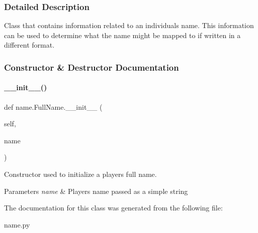 \subsubsection{Detailed Description}
\begin{DoxyVerb}Class that contains information related to an individuals name. This information can be used to determine what the name might be mapped to if written in a different format.
\end{DoxyVerb}
 

\subsubsection{Constructor \& Destructor Documentation}
\mbox{\label{classname_1_1FullName_a28652799b3836b5dbad3504fdc70c34c}} 
\paragraph{\texorpdfstring{\+\_\+\+\_\+init\+\_\+\+\_\+()}{\_\_init\_\_()}}
{\footnotesize\ttfamily def name.\+Full\+Name.\+\_\+\+\_\+init\+\_\+\+\_\+ (\begin{DoxyParamCaption}\item[{}]{self,  }\item[{}]{name }\end{DoxyParamCaption})}



Constructor used to initialize a player\textquotesingle{}s full name. 


\begin{DoxyParams}{Parameters}
{\em name} & Player\textquotesingle{}s name passed as a simple string \\
\hline
\end{DoxyParams}


The documentation for this class was generated from the following file\+:\begin{DoxyCompactItemize}
\item 
name.\+py\end{DoxyCompactItemize}
